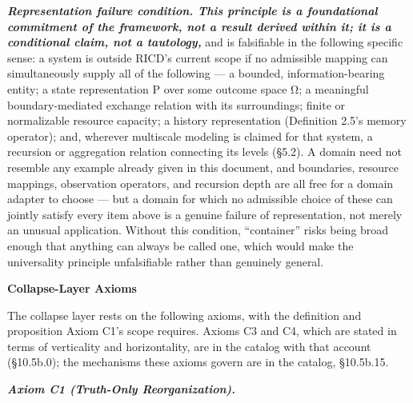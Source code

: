 \documentclass[
]{article}
\begin{document}
\emph{\textbf{Representation failure condition. This principle is a
foundational commitment of the framework, not a result derived within
it; it is a conditional claim, not a tautology,}} and is falsifiable in
the following specific sense: a system is outside RICD's current scope
if no admissible mapping can simultaneously supply all of the following
--- a bounded, information-bearing entity; a state representation P over
some outcome space Ω; a meaningful boundary-mediated exchange relation
with its surroundings; finite or normalizable resource capacity; a
history representation (Definition 2.5's memory operator); and, wherever
multiscale modeling is claimed for that system, a recursion or
aggregation relation connecting its levels (§5.2). A domain need not
resemble any example already given in this document, and boundaries,
resource mappings, observation operators, and recursion depth are all
free for a domain adapter to choose --- but a domain for which no
admissible choice of these can jointly satisfy every item above is a
genuine failure of representation, not merely an unusual application.
Without this condition, ``container'' risks being broad enough that
anything can always be called one, which would make the universality
principle unfalsifiable rather than genuinely general.

\textbf{Collapse-Layer Axioms}

The collapse layer rests on the following axioms, with the definition
and proposition Axiom C1's scope requires. Axioms C3 and C4, which are
stated in terms of verticality and horizontality, are in the catalog
with that account (§10.5b.0); the mechanisms these axioms govern are in
the catalog, §10.5b.15.

\emph{\textbf{Axiom C1 (Truth-Only Reorganization).}}
\end{document}

